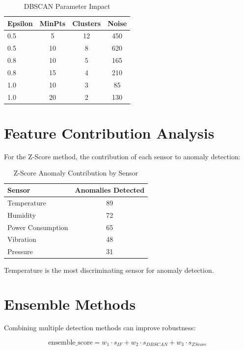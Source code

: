 \documentclass[12pt,a4paper]{report}
\begin{document}
\begin{table}[H]
\centering
\caption{DBSCAN Parameter Impact}
\begin{tabular}{lccc}
\toprule
\textbf{Epsilon} & \textbf{MinPts} & \textbf{Clusters} & \textbf{Noise} \\
\midrule
0.5 & 5 & 12 & 450 \\
0.5 & 10 & 8 & 620 \\
0.8 & 10 & 5 & 165 \\
0.8 & 15 & 4 & 210 \\
1.0 & 10 & 3 & 85 \\
1.0 & 20 & 2 & 130 \\
\bottomrule
\end{tabular}
\end{table}

\section{Feature Contribution Analysis}

For the Z-Score method, the contribution of each sensor to anomaly detection:

\begin{table}[H]
\centering
\caption{Z-Score Anomaly Contribution by Sensor}
\begin{tabular}{lc}
\toprule
\textbf{Sensor} & \textbf{Anomalies Detected} \\
\midrule
Temperature & 89 \\
Humidity & 72 \\
Power Consumption & 65 \\
Vibration & 48 \\
Pressure & 31 \\
\bottomrule
\end{tabular}
\end{table}

Temperature is the most discriminating sensor for anomaly detection.

\section{Ensemble Methods}

Combining multiple detection methods can improve robustness:

\begin{equation}
\text{ensemble\_score} = w_1 \cdot s_{IF} + w_2 \cdot s_{DBSCAN} + w_3 \cdot s_{ZScore}
\end{equation}
\end{document}
